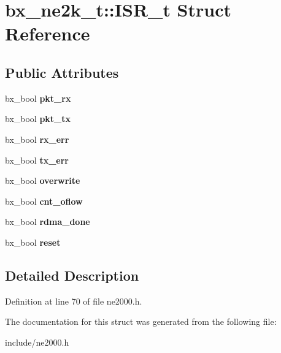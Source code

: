 \hypertarget{structbx__ne2k__t_1_1ISR__t}{\section{bx\-\_\-ne2k\-\_\-t\-:\-:I\-S\-R\-\_\-t Struct Reference}
\label{structbx__ne2k__t_1_1ISR__t}
}
\subsection*{Public Attributes}
\begin{DoxyCompactItemize}
\item 
\hypertarget{structbx__ne2k__t_1_1ISR__t_a9142b75942a83c787f33c13a29254911}{bx\-\_\-bool {\bfseries pkt\-\_\-rx}}\label{structbx__ne2k__t_1_1ISR__t_a9142b75942a83c787f33c13a29254911}

\item 
\hypertarget{structbx__ne2k__t_1_1ISR__t_adc282cfe4bbb8c09bc0bd061fd85bd4a}{bx\-\_\-bool {\bfseries pkt\-\_\-tx}}\label{structbx__ne2k__t_1_1ISR__t_adc282cfe4bbb8c09bc0bd061fd85bd4a}

\item 
\hypertarget{structbx__ne2k__t_1_1ISR__t_aa01381a83cadfb17b8055ace0088ae62}{bx\-\_\-bool {\bfseries rx\-\_\-err}}\label{structbx__ne2k__t_1_1ISR__t_aa01381a83cadfb17b8055ace0088ae62}

\item 
\hypertarget{structbx__ne2k__t_1_1ISR__t_a686ff4c1096fc8a7f054ad3baa3244cb}{bx\-\_\-bool {\bfseries tx\-\_\-err}}\label{structbx__ne2k__t_1_1ISR__t_a686ff4c1096fc8a7f054ad3baa3244cb}

\item 
\hypertarget{structbx__ne2k__t_1_1ISR__t_aa7044dc93ea9692c8ee73126584579f2}{bx\-\_\-bool {\bfseries overwrite}}\label{structbx__ne2k__t_1_1ISR__t_aa7044dc93ea9692c8ee73126584579f2}

\item 
\hypertarget{structbx__ne2k__t_1_1ISR__t_a82e8d1404286b3db13ddc691e20090a0}{bx\-\_\-bool {\bfseries cnt\-\_\-oflow}}\label{structbx__ne2k__t_1_1ISR__t_a82e8d1404286b3db13ddc691e20090a0}

\item 
\hypertarget{structbx__ne2k__t_1_1ISR__t_a6027e4e72aa6106be45efd8b49bc632c}{bx\-\_\-bool {\bfseries rdma\-\_\-done}}\label{structbx__ne2k__t_1_1ISR__t_a6027e4e72aa6106be45efd8b49bc632c}

\item 
\hypertarget{structbx__ne2k__t_1_1ISR__t_ae8f7f38d5a9bdaf3d8c5ac02dacf40eb}{bx\-\_\-bool {\bfseries reset}}\label{structbx__ne2k__t_1_1ISR__t_ae8f7f38d5a9bdaf3d8c5ac02dacf40eb}

\end{DoxyCompactItemize}


\subsection{Detailed Description}


Definition at line 70 of file ne2000.\-h.



The documentation for this struct was generated from the following file\-:\begin{DoxyCompactItemize}
\item 
include/ne2000.\-h\end{DoxyCompactItemize}
